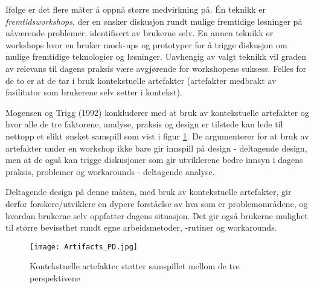 \noindent
Ifølge \cite{Mogensen92} er det flere måter å oppnå større medvirkning på. Én teknikk er \emph{fremtidsworkshops}, der en ønsker diskusjon rundt mulige fremtidige løsninger på nåværende problemer, identifisert av brukerne selv. En annen teknikk er workshops hvor en bruker mock-ups og prototyper for å trigge diskusjon om mulige fremtidige teknologier og løsninger. Uavhengig av valgt teknikk vil graden av relevans til dagens praksis være avgjørende for workshopens suksess. Felles for de to er at de tar i bruk kontekstuelle artefakter (artefakter medbrakt av fasilitator som brukerene selv setter i kontekst).

\noindent
Mogensen og Trigg (1992) konkluderer med at bruk av kontekstuelle artefakter og hvor alle de tre faktorene, analyse, praksis og design er tilstede kan lede til nettopp et slikt ønsket samspill som vist i figur \ref{Artifacts_PD}. De argumenterer for at bruk av artefakter under en workshop ikke bare gir innspill på design - deltagende design, men at de også kan trigge diskusjoner som gir utviklerene bedre innsyn i dagens praksis, problemer og workarounds - deltagende analyse. 

\noindent
Deltagende design på denne måten, med bruk av kontekstuelle artefakter, gir derfor forskere/utviklere en dypere forståelse av hva som er problemområdene, og hvordan brukerne selv oppfatter dagens situasjon. Det gir også brukerne mulighet til større bevissthet rundt egne arbeidsmetoder, -rutiner og workarounds.

\begin{figure}[H]
\centering
\texttt{[image: Artifacts\_PD.jpg]}
\caption{Kontekstuelle artefakter støtter samspillet mellom de tre perspektivene}
\label{Artifacts_PD}
\end{figure}